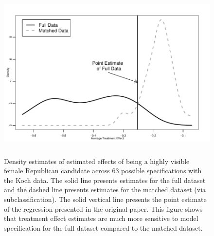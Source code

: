 \documentclass[11pt,letterpaper]{article}
\theoremstyle{plain}
\newcommand\spacingset[1]{\renewcommand{\baselinestretch}%
  {#1}\small\normalsize}
\begin{document}
\begin{figure}[ht]
  \spacingset{1} 
  \begin{center}
    \includegraphics[height=3.5in,angle=0]{dens.pdf}
  \end{center}
  \vspace{-0.275in}
  \caption{Density estimates of estimated effects of being
    a highly visible female Republican candidate across 63 possible
    specifications with the Koch data.  The solid line presents
    estimates for the full dataset and the dashed line presents
    estimates for the matched dataset (via subclassification).  The
    solid vertical line presents the point estimate of the regression
    presented in the original paper.  This figure shows that treatment
    effect estimates are much more sensitive to model specification
    for the full dataset compared to the matched dataset.}
  \label{fg:kochdens}
\end{figure}
\end{document}
